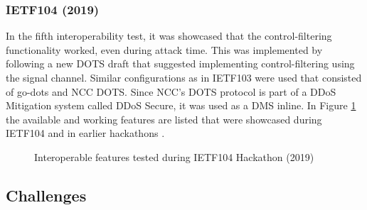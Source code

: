 \subsubsection{IETF104 (2019)}
In the fifth interoperability test, it was showcased that the control-filtering functionality worked, even during attack time. This was implemented by following a new DOTS draft that suggested implementing control-filtering using the signal channel. Similar configurations as in IETF103 were used that consisted of go-dots and NCC DOTS. Since NCC's DOTS protocol is part of a DDoS Mitigation system called DDoS Secure, it was used as a DMS inline. In Figure \ref{fig:features-interop} the available and working features are listed that were showcased during IETF104 and in earlier hackathons \cite{interop-104}.

\begin{figure}[H]
\label{fig:features-interop}
\centering
\caption{Interoperable features tested during IETF104 Hackathon (2019)}
\end{figure}

\subsection{Challenges}

